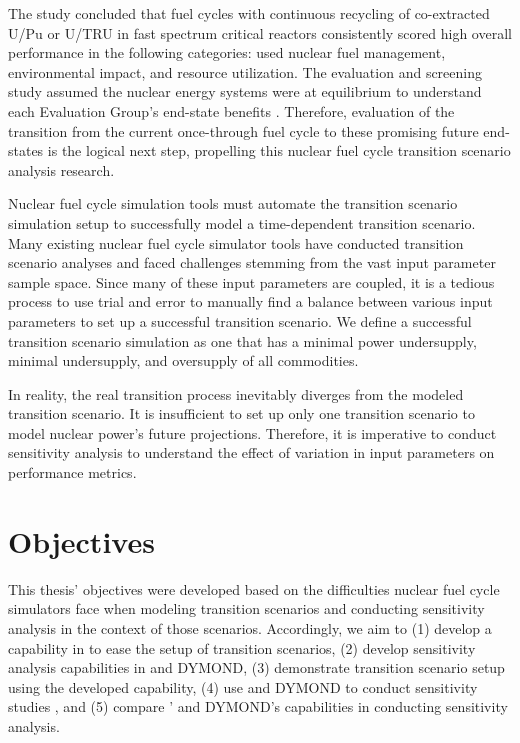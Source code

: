 The study concluded that fuel cycles with continuous recycling
of co-extracted U/Pu or U/TRU in fast spectrum critical reactors
consistently scored high overall performance in the following 
categories: used nuclear fuel management, environmental impact, 
and resource utilization. 
The evaluation and screening study assumed
the nuclear energy systems were at equilibrium to understand 
each Evaluation Group's
end-state benefits \cite{feng_standardized_2016}. 
Therefore, evaluation of the transition from the current 
once-through fuel cycle to these promising 
future end-states \cite{feng_standardized_2016} 
is the logical next step, propelling this
nuclear fuel cycle transition scenario analysis research. 

Nuclear fuel cycle simulation tools must automate the transition scenario simulation 
setup to successfully model a time-dependent transition scenario. 
Many existing nuclear fuel cycle simulator tools have conducted 
transition scenario analyses 
\cite{feng_standardized_2016,bae_standardized_2019,coquelet-pascal_cosi6:_2015}
and faced challenges stemming from the vast input parameter
sample space.
Since many of these input parameters are coupled, it is 
a tedious process to use trial and error to manually find a balance 
between various input parameters to set up a successful transition 
scenario. 
We define a successful transition scenario simulation as one that 
has a minimal power undersupply, minimal undersupply, 
and oversupply of all commodities. 
 
In reality, the real transition process inevitably diverges
from the modeled transition scenario. 
It is insufficient to set up only one transition scenario to model 
nuclear power's future projections.
Therefore, it is imperative to conduct sensitivity analysis to understand 
the effect of variation in input parameters on 
performance metrics. 

\section{Objectives}
This thesis' objectives were developed based on the difficulties 
nuclear fuel cycle simulators face when modeling transition scenarios 
and conducting sensitivity analysis in the context of those scenarios.
Accordingly, we aim to 
(1) develop a capability in \Cyclus to ease the setup of 
transition scenarios, 
(2) develop sensitivity analysis capabilities in \Cyclus and DYMOND, 
(3) demonstrate \Cyclus transition scenario setup using the 
developed capability,
(4) use \Cyclus and DYMOND to conduct sensitivity studies
, and
(5) compare \Cyclus' and DYMOND's capabilities in conducting sensitivity 
analysis. 
